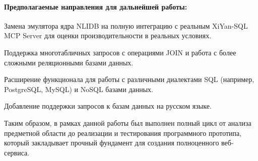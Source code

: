 \paragraph{Предполагаемые направления для дальнейшей работы:}
\begin{compactitem}
      \item Замена эмулятора ядра NLIDB на полную интеграцию с реальным XiYan-SQL MCP Server для оценки производительности в реальных условиях.
      \item Поддержка многотабличных запросов с операциями JOIN и работа с более сложными реляционными базами данных.
      \item Расширение функционала для работы с различными диалектами SQL (например, PostgreSQL, MySQL) и NoSQL базами данных.
      \item Добавление поддержки запросов к базам данных на русском языке.
\end{compactitem}

Таким образом, в рамках данной работы был выполнен полный цикл от анализа предметной области до реализации и тестирования программного прототипа, который закладывает прочный фундамент для создания полноценного веб-сервиса.